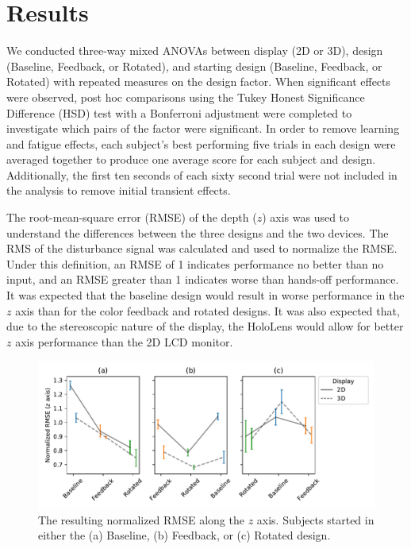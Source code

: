 \section{Results}
We conducted three-way mixed ANOVAs between display (2D or 3D), design (Baseline, Feedback, or Rotated), and starting design (Baseline, Feedback, or Rotated) with repeated measures on the design factor.
When significant effects were observed, post hoc comparisons using the Tukey Honest Significance Difference (HSD) test with a Bonferroni adjustment were completed to investigate which pairs of the factor were significant.
In order to remove learning and fatigue effects, each subject's best performing five trials in each design were averaged together to produce one average score for each subject and design.
Additionally, the first ten seconds of each sixty second trial were not included in the analysis to remove initial transient effects.

The root-mean-square error (RMSE) of the depth ($z$) axis was used to understand the differences between the three designs and the two devices.
The RMS of the disturbance signal was calculated and used to normalize the RMSE.
Under this definition, an RMSE of 1 indicates performance no better than no input, and an RMSE greater than 1 indicates worse than hands-off performance.
It was expected that the baseline design would result in worse performance in the $z$ axis than for the color feedback and rotated designs.
It was also expected that, due to the stereoscopic nature of the display, the HoloLens would allow for better $z$ axis performance than the 2D LCD monitor.

\begin{figure}[tb!]
    \begin{center}
        \includegraphics[width=\linewidth]{figures/AR/x_design_y_zrmse_col_startdesign_hue_device.png}
        \caption[The resulting normalized RMSE along the $z$ axis]{The resulting normalized RMSE along the $z$ axis. Subjects started in either the (a) Baseline, (b) Feedback, or (c) Rotated design.}
        \label{fig:zrmseanovas}
    \end{center}
\end{figure}

